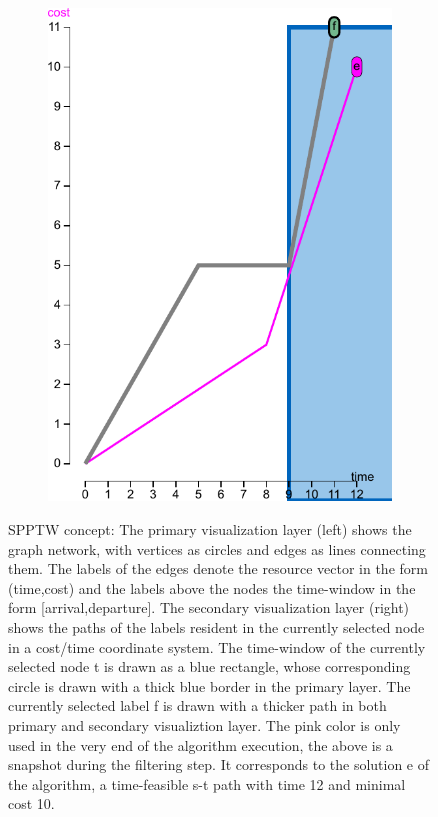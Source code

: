 \begin{figure}
\begin{subfigure}[t]{0.45\textwidth}
\includegraphics[width=\textwidth]{fig/spp-rc-graph-algorithm-labels}
\end{subfigure}
\caption{SPPTW concept: The primary visualization layer (left) shows the graph network, with vertices as circles and edges as lines connecting them. The labels of the edges denote the resource vector in the form (time,cost) and the labels above the nodes the time-window in the form [arrival,departure]. The secondary visualization layer (right) shows the paths of the labels resident in the currently selected node in a cost/time coordinate system. The time-window of the currently selected node t is drawn as a blue rectangle, whose corresponding circle is drawn with a thick blue border in the primary layer. The currently selected label f is drawn with a thicker path in both primary and secondary visualiztion layer. The pink color is only used in the very end of the algorithm execution, the above is a snapshot during the filtering step. It corresponds to the solution e of the algorithm, a time-feasible s-t path with time 12 and minimal cost 10.}
\label{fig:spprc}
\end{figure}


